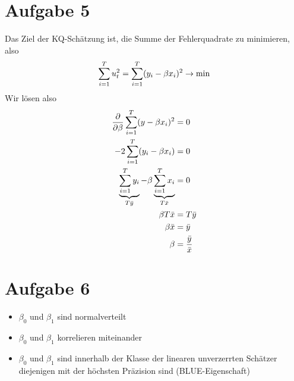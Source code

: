 \documentclass{article}
\begin{document}
	\section*{Aufgabe 5}
	Das Ziel der KQ-Schätzung ist, die Summe der Fehlerquadrate zu minimieren, also
	\begin{align}
		\sum_{i=1}^T u_t^2 = \sum_{i=1}^T (y_i - \beta x_i)^2 \to\min \notag
	\end{align}
	Wir lösen also
	\begin{align}
		\frac{\partial}{\partial\beta} \sum_{i=1}^T (y-\beta x_i)^2 &= 0 \notag \\
		-2\sum_{i=1}^T (y_i-\beta x_i) &=0 \notag \\
		\underbrace{\sum_{i=1}^T y_i}_{T\bar{y}} - \beta\underbrace{\sum_{i=1}^T x_i}_{T\bar{x}} &=0 \notag \\
		\beta T\bar{x} &= T\bar{y} \notag \\
		\beta\bar{x} &= \bar{y} \notag \\
		\beta &= \frac{\bar{y}}{\bar{x}} \notag
	\end{align}
	
	\section*{Aufgabe 6}
	\begin{itemize}
		\item $\beta_0$ und $\beta_1$ sind normalverteilt
		\item $\beta_0$ und $\beta_1$ korrelieren miteinander
		\item $\beta_0$ und $\beta_1$ sind innerhalb der Klasse der linearen unverzerrten Schätzer diejenigen mit der höchsten Präzision sind (BLUE-Eigenschaft)
	\end{itemize}
\end{document}

